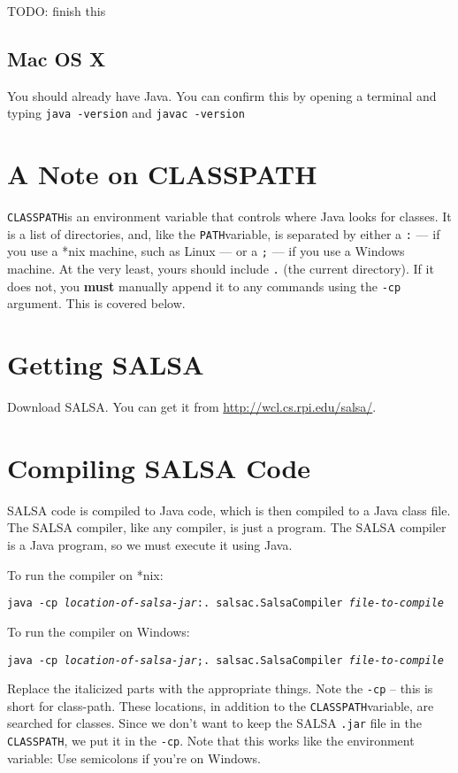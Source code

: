 \documentclass{article}
\newcommand{\envPATH}{\texttt{PATH}}
\newcommand{\envCLASSPATH}{\texttt{CLASSPATH}}
\begin{document}
TODO: finish this

\subsection{Mac OS X}
You should already have Java. You can confirm this by opening a terminal and
typing \texttt{java -version} and \texttt{javac -version}

\section{A Note on CLASSPATH}
\envCLASSPATH is an environment variable that controls where Java looks for
classes. It is a list of directories, and, like the \envPATH variable, is
separated by either a \texttt{:} --- if you use a *nix machine, such as
Linux --- or a \texttt{;} --- if you use a Windows machine.
At the very least, yours should include \texttt{.} (the current directory).
If it does not, you \textbf{must} manually append it to any commands using
the \texttt{-cp} argument. This is covered below.

\section{Getting SALSA}
Download SALSA. You can get it from \url{http://wcl.cs.rpi.edu/salsa/}.

\section{Compiling SALSA Code}
SALSA code is compiled to Java code, which is then compiled to a Java class
file. The SALSA compiler, like any compiler, is just a program. The SALSA
compiler is a Java program, so we must execute it using Java.

To run the compiler on *nix:

\texttt{java -cp \textit{location-of-salsa-jar}:. salsac.SalsaCompiler
\textit{file-to-compile}}

To run the compiler on Windows:

\texttt{java -cp \textit{location-of-salsa-jar};. salsac.SalsaCompiler
\textit{file-to-compile}}

Replace the italicized parts with the appropriate things. Note the
\texttt{-cp} -- this is short for class-path. These locations, in addition to
the \envCLASSPATH variable, are searched for classes. Since we don't want to
keep the SALSA \texttt{.jar} file in the \envCLASSPATH, we put it in the
\texttt{-cp}. Note that this works like the environment variable: Use
semicolons if you're on Windows.
\end{document}
